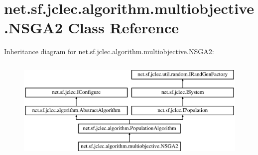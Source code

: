 \hypertarget{classnet_1_1sf_1_1jclec_1_1algorithm_1_1multiobjective_1_1_n_s_g_a2}{\section{net.\-sf.\-jclec.\-algorithm.\-multiobjective.\-N\-S\-G\-A2 Class Reference}
\label{classnet_1_1sf_1_1jclec_1_1algorithm_1_1multiobjective_1_1_n_s_g_a2}
}
Inheritance diagram for net.\-sf.\-jclec.\-algorithm.\-multiobjective.\-N\-S\-G\-A2\-:\begin{figure}[H]
\begin{center}
\leavevmode
\includegraphics[height=5.000000cm]{classnet_1_1sf_1_1jclec_1_1algorithm_1_1multiobjective_1_1_n_s_g_a2}
\end{center}
\end{figure}
